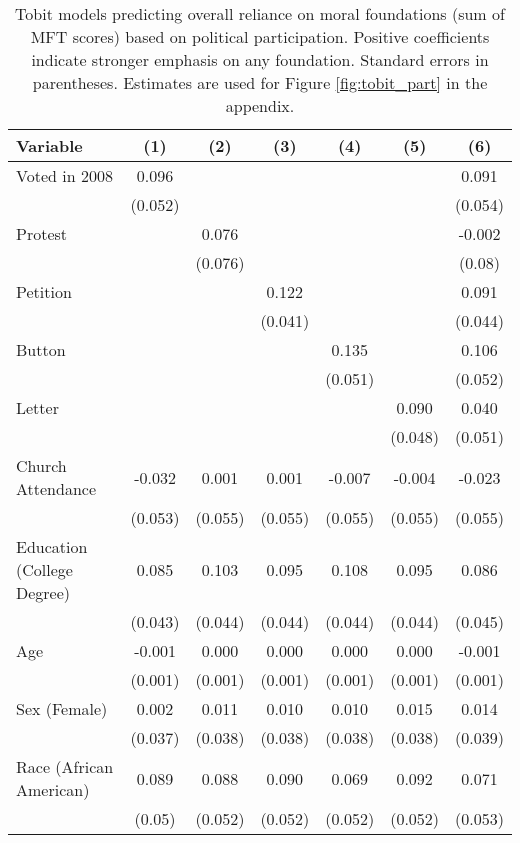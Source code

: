\begin{table}[ht]
\centering
\caption{Tobit models predicting overall reliance on moral foundations
           (sum of MFT scores) based on political participation. Positive coefficients indicate 
           stronger emphasis on any foundation. Standard errors in parentheses. Estimates are 
           used for Figure \ref{fig:tobit_part} in the appendix.} 
\label{tab:tobit_part}
\begingroup\footnotesize
\begin{tabular}{lcccccc}
  \hline
Variable & (1) & (2) & (3) & (4) & (5) & (6) \\ 
  \hline
Voted in 2008 &  0.096 &  &  &  &  &  0.091 \\ 
   & (0.052) &  &  &  &  & (0.054) \\ 
  Protest &  &  0.076 &  &  &  & -0.002 \\ 
   &  & (0.076) &  &  &  & (0.08) \\ 
  Petition &  &  &  0.122 &  &  &  0.091 \\ 
   &  &  & (0.041) &  &  & (0.044) \\ 
  Button &  &  &  &  0.135 &  &  0.106 \\ 
   &  &  &  & (0.051) &  & (0.052) \\ 
  Letter &  &  &  &  &  0.090 &  0.040 \\ 
   &  &  &  &  & (0.048) & (0.051) \\ 
  Church Attendance & -0.032 &  0.001 &  0.001 & -0.007 & -0.004 & -0.023 \\ 
   & (0.053) & (0.055) & (0.055) & (0.055) & (0.055) & (0.055) \\ 
  Education (College Degree) &  0.085 &  0.103 &  0.095 &  0.108 &  0.095 &  0.086 \\ 
   & (0.043) & (0.044) & (0.044) & (0.044) & (0.044) & (0.045) \\ 
  Age & -0.001 &  0.000 &  0.000 &  0.000 &  0.000 & -0.001 \\ 
   & (0.001) & (0.001) & (0.001) & (0.001) & (0.001) & (0.001) \\ 
  Sex (Female) &  0.002 &  0.011 &  0.010 &  0.010 &  0.015 &  0.014 \\ 
   & (0.037) & (0.038) & (0.038) & (0.038) & (0.038) & (0.039) \\ 
  Race (African American) &  0.089 &  0.088 &  0.090 &  0.069 &  0.092 &  0.071 \\ 
   & (0.05) & (0.052) & (0.052) & (0.052) & (0.052) & (0.053) \\ 

\end{tabular}
\end{table}
